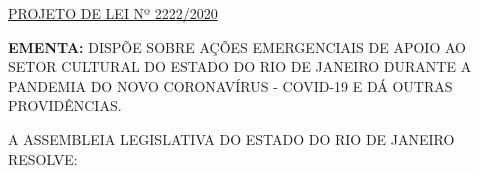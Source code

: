 \documentclass[10pt]{article}
\date{}
\begin{document}
\maketitle
\begin{center}
  \huge
  \vspace{-3cm}\href{http://alerjln1.alerj.rj.gov.br/scpro1923.nsf/f4b46b3cdbba990083256cc900746cf6/2073d5bb816dad4e0325853c004feede?OpenDocument}{PROJETO DE LEI Nº 2222/2020}
\bigskip
\bigskip
\bigskip
  
\end{center}

\textbf{EMENTA:} 
DISPÕE SOBRE AÇÕES EMERGENCIAIS DE APOIO AO SETOR CULTURAL DO ESTADO DO RIO DE JANEIRO DURANTE A PANDEMIA DO NOVO CORONAVÍRUS - COVID-19 E DÁ OUTRAS PROVIDÊNCIAS.








\bigskip

\noindent
A ASSEMBLEIA LEGISLATIVA DO ESTADO DO RIO DE JANEIRO RESOLVE:
\end{document}
